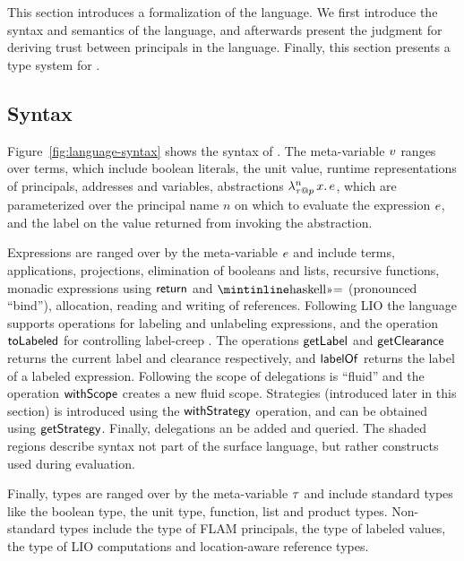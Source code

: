 This section introduces a formalization of the \lang{} language. We first introduce the syntax and semantics of the language, and afterwards present the judgment for deriving trust between principals in the language. Finally, this section presents a type system for \lang.

\subsection{Syntax}

Figure~\ref{fig:language-syntax} shows the syntax of \lang. The meta-variable $v$ ranges over terms, which include boolean literals, the unit value, runtime representations of principals, addresses and variables, abstractions $\lambda^{n}_{\tau \mathbin{@} p}\,x.\,e$, which are parameterized over the principal name $n$ on which to evaluate the expression $e$, and the label on the value returned from invoking the abstraction.

Expressions are ranged over by the meta-variable $e$ and include terms, applications, projections, elimination of booleans and lists, recursive functions, monadic expressions using $\mathsf{return}$ and $\bindop$ (pronounced ``bind''), allocation, reading and writing of references. Following LIO \cite{SRMMlio} the language supports operations for labeling and unlabeling expressions, and the operation $\mathsf{toLabeled}$ for controlling label-creep \cite{SRMMlio}. The operations $\mathsf{getLabel}$ and $\mathsf{getClearance}$ returns the current label and clearance respectively, and $\mathsf{labelOf}$ returns the label of a labeled expression. Following \cite{Moore:2016:EAC:2983990.2984021} the scope of delegations is ``fluid'' and the operation $\mathsf{withScope}$ creates a new fluid scope. Strategies (introduced later in this section) is introduced using the $\mathsf{withStrategy}$ operation, and can be obtained using $\mathsf{getStrategy}$. Finally, delegations an be added and queried. The shaded regions describe syntax not part of the surface language, but rather constructs used during evaluation.

Finally, types are ranged over by the meta-variable $\tau$ and include standard types like the boolean type, the unit type, function, list and product types. Non-standard types include the type of FLAM principals, the type of labeled values, the type of LIO computations and location-aware reference types.

